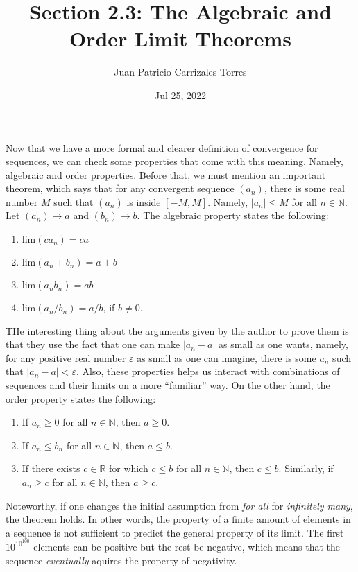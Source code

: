 \documentclass[12pt]{article}
\newcommand{\N}{\mathbb{N}}
\newcommand{\R}{\mathbb{R}}
\newcommand{\Lim}[1]{\mathrm{lim}\left( #1\right)}
\begin{document}
  
\title{Section 2.3: The Algebraic and Order Limit Theorems}
   \author{Juan Patricio Carrizales Torres}
     \date{Jul 25, 2022}
       \maketitle 
       Now that we have a more formal and clearer definition of convergence for sequences, we can check some properties that come with this meaning. Namely, algebraic and order properties. Before that, we must mention an important theorem, which says that for any convergent sequence $(a_{n})$, there is some real number $M$ such that $(a_{n})$ is inside $[-M,M]$. Namely, $|a_{n}|\leq M$ for all $n\in \N$.
       Let $(a_{n})\to a$ and $(b_{n})\to b$. The algebraic property states the following: 
       \begin{enumerate}[label=(\roman*)]
	 \item $\Lim{ca_{n}} = ca$
	 \item $\Lim{a_{n}+b_{n}} = a + b$
	 \item $\Lim{a_{n}b_{n}} = ab$
	 \item $\Lim{a_{n}/b_{n}} = a/b$, if $b\neq0$.
    \end{enumerate}
    THe interesting thing about the arguments given by the author to prove them is that they use the fact that one can make $|a_{n} -a|$ as small as one wants, namely, for any positive real number $\varepsilon$ as small as one can imagine, there is some $a_{n}$ such that $|a_{n}-a|<\varepsilon$. Also, these properties helps us interact with combinations of sequences and their limits on a more ``familiar'' way. On the other hand, the order property states the following:
       \begin{enumerate}[label=(\roman*)]
	 \item If $a_{n}\geq 0$ for all $n\in \N$, then $a\geq0$.
	 \item If $a_{n}\leq b_{n}$ for all $n\in\N$, then $a\leq b$.
	 \item If there exists $c\in \R$ for which $c\leq b$ for all $n\in \N$, then $c\leq b$. Similarly, if $a_{n}\geq c$ for all $n\in \N$, then $a\geq c$. 
    \end{enumerate}
    Noteworthy, if one changes the initial assumption from \textit{for all} for \textit{infinitely many}, the theorem holds. In other words, the property of a finite amount of elements in a sequence is not sufficient to predict the general property of its limit. The first $10^{10^{100}}$ elements can be positive but the rest be negative, which means that the sequence \textit{eventually} aquires the property of negativity. 
\end{document}
